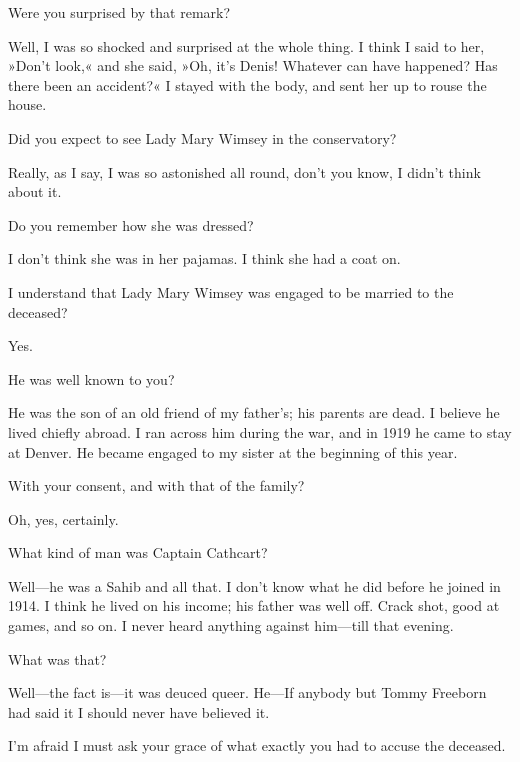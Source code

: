 \begin{dialogue}

 Were you surprised by that remark?

 Well, I was so shocked and surprised at the whole thing.  I think I said to her, »Don't look,« and she said, »Oh, it's Denis!  Whatever can have happened? Has there been an accident?« I stayed with the body, and sent her up to rouse the house.

 Did you expect to see Lady Mary Wimsey in the conservatory?

 Really, as I say, I was so astonished all round, don't you know, I didn't think about it.

 Do you remember how she was dressed?

 I don't think she was in her pajamas.  I think she had a coat on.

 I understand that Lady Mary Wimsey was engaged to be married to the deceased?

 Yes.

 He was well known to you?

 He was the son of an old friend of my father's; his parents are dead. I believe he lived chiefly abroad. I ran across him during the war, and in 1919 he came to stay at Denver. He became engaged to my sister at the beginning of this year.

 With your consent, and with that of the family?

 Oh, yes, certainly.

 What kind of man was Captain Cathcart?

 Well\allowbreak---\allowbreak he was a Sahib and all that. I don't know what he did before he joined in 1914. I think he lived on his income; his father was well off. Crack shot, good at games, and so on. I never heard anything against him\allowbreak---\allowbreak till that evening.

 What was that?

 Well\allowbreak---\allowbreak the fact is\allowbreak---\allowbreak it was deuced queer. He\allowbreak---\allowbreak If anybody but Tommy Freeborn had said it I should never have believed it. 

 I'm afraid I must ask your grace of what exactly you had to accuse the deceased.


\end{dialogue}
